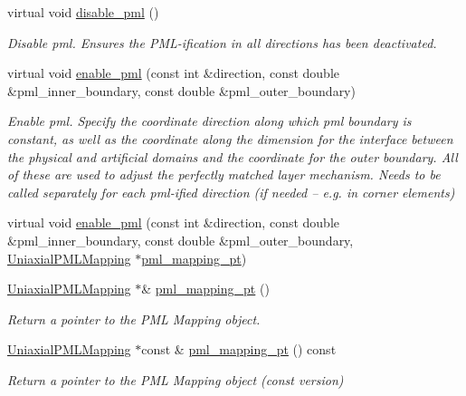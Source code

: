 \begin{DoxyCompactItemize}
\item 
virtual void \hyperlink{classoomph_1_1AxisAlignedPMLElement_ace457b4782c083fd8b0925ae6b19a3e3}{disable\+\_\+pml} ()
\begin{DoxyCompactList}\small\item\em Disable pml. Ensures the P\+M\+L-\/ification in all directions has been deactivated. \end{DoxyCompactList}\item 
virtual void \hyperlink{classoomph_1_1AxisAlignedPMLElement_a76a879c7122fc2e5b723fbc7ce6b602b}{enable\+\_\+pml} (const int \&direction, const double \&pml\+\_\+inner\+\_\+boundary, const double \&pml\+\_\+outer\+\_\+boundary)
\begin{DoxyCompactList}\small\item\em Enable pml. Specify the coordinate direction along which pml boundary is constant, as well as the coordinate along the dimension for the interface between the physical and artificial domains and the coordinate for the outer boundary. All of these are used to adjust the perfectly matched layer mechanism. Needs to be called separately for each pml-\/ified direction (if needed -- e.\+g. in corner elements) \end{DoxyCompactList}\item 
virtual void \hyperlink{classoomph_1_1AxisAlignedPMLElement_a157cd9d30c5d1f86d17b4b25bc705f76}{enable\+\_\+pml} (const int \&direction, const double \&pml\+\_\+inner\+\_\+boundary, const double \&pml\+\_\+outer\+\_\+boundary, \hyperlink{classoomph_1_1UniaxialPMLMapping}{Uniaxial\+P\+M\+L\+Mapping} $\ast$\hyperlink{classoomph_1_1AxisAlignedPMLElement_adcb4bb14ff2f185cdfd31aa51b1f015d}{pml\+\_\+mapping\+\_\+pt})
\item 
\hyperlink{classoomph_1_1UniaxialPMLMapping}{Uniaxial\+P\+M\+L\+Mapping} $\ast$\& \hyperlink{classoomph_1_1AxisAlignedPMLElement_adcb4bb14ff2f185cdfd31aa51b1f015d}{pml\+\_\+mapping\+\_\+pt} ()
\begin{DoxyCompactList}\small\item\em Return a pointer to the P\+ML Mapping object. \end{DoxyCompactList}\item 
\hyperlink{classoomph_1_1UniaxialPMLMapping}{Uniaxial\+P\+M\+L\+Mapping} $\ast$const  \& \hyperlink{classoomph_1_1AxisAlignedPMLElement_ab67dd8501cbdeb896ff34d3cd8645434}{pml\+\_\+mapping\+\_\+pt} () const
\begin{DoxyCompactList}\small\item\em Return a pointer to the P\+ML Mapping object (const version) \end{DoxyCompactList}\item 

\end{DoxyCompactItemize}
